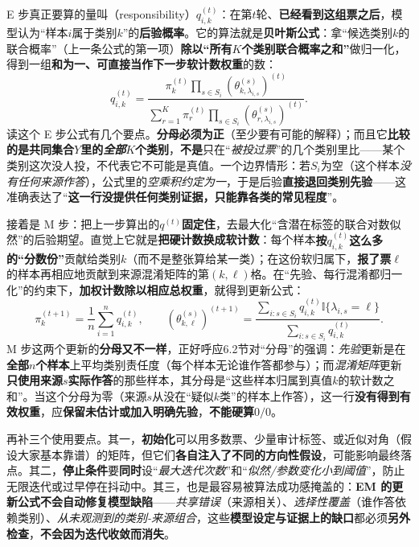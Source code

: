 E 步真正要算的量叫（responsibility）$q_{i,k}^{(t)}$：在第$t$轮、\textbf{已经看到这组票之后}，模型认为“样本$i$属于类别$k$”的\textbf{后验概率}。它的算法就是\textbf{贝叶斯公式}：拿“候选类别$k$的联合概率”（上一条公式的第一项）\textbf{除以“所有$K$个类别联合概率之和”}做归一化，得到一组\textbf{和为一、可直接当作下一步软计数权重}的数：
\begin{equation}
  q_{i,k}^{(t)}
  =
  \frac{\pi_k^{(t)}
    \prod_{s\in S_i}
    \left(\theta^{(s)}_{k,\lambda_{i,s}}\right)^{(t)}}
  {\sum_{r=1}^{K}\pi_r^{(t)}
    \prod_{s\in S_i}
    \left(\theta^{(s)}_{r,\lambda_{i,s}}\right)^{(t)}}.
  \label{eq:knowledge-fusion-dawid-skene-e-step}
\end{equation}
读这个 E 步公式有几个要点。\textbf{分母必须为正}（至少要有可能的解释）；而且它\textbf{比较的是共同集合$Y$里的\emph{全部}$K$个类别}，\textbf{不是}只在“\emph{被投过票}”的几个类别里比——某个类别这次没人投，不代表它不可能是真值。一个边界情形：若$S_i$为空（这个样本\emph{没有任何来源作答}），公式里的\emph{空乘积约定为一}，于是后验\textbf{直接退回类别先验}——这准确表达了“\textbf{这一行没提供任何类别证据，只能靠各类的常见程度}”。

接着是 M 步：把上一步算出的$q^{(t)}$\textbf{固定住}，去最大化“含潜在标签的联合对数似然”的后验期望。直觉上它就是\textbf{把硬计数换成软计数}：每个样本\textbf{按$q_{i,k}^{(t)}$这么多的“分数份”}贡献给类别$k$（而不是整张算给某一类）；在这份软归属下，\textbf{报了票$\ell$}的样本再相应地贡献到来源混淆矩阵的第$(k,\ell)$格。在“先验、每行混淆都归一化”的约束下，\textbf{加权计数除以相应总权重}，就得到更新公式：
\begin{equation}
  \pi_k^{(t+1)}
  =\frac{1}{n}\sum_{i=1}^{n}q_{i,k}^{(t)},
  \qquad
  \left(\theta^{(s)}_{k,\ell}\right)^{(t+1)}
  =
  \frac{\sum_{i:s\in S_i}
    q_{i,k}^{(t)}\mathbb{I}\{\lambda_{i,s}=\ell\}}
  {\sum_{i:s\in S_i}q_{i,k}^{(t)}}.
  \label{eq:knowledge-fusion-dawid-skene-m-step}
\end{equation}
M 步这两个更新的\textbf{分母又不一样}，正好呼应6.2节对“分母”的强调：\emph{先验}更新是在\textbf{全部$n$个样本}上平均类别责任度（每个样本无论谁作答都参与）；而\emph{混淆矩阵}更新\textbf{只使用来源$s$实际作答}的那些样本，其分母是“这些样本归属到真值$k$的软计数之和”。当这个分母为零（来源$s$从没在“疑似$k$类”的样本上作答），这一行\textbf{没有得到有效权重}，应\textbf{保留未估计或加入明确先验}，\textbf{不能硬算$0/0$}。

再补三个使用要点。其一，\textbf{初始化}可以用多数票、少量审计标签、或近似对角（假设大家基本靠谱）的矩阵，但它们\textbf{各自注入了不同的方向性假设}，可能影响最终落点。其二，\textbf{停止条件}要\textbf{同时}设“\emph{最大迭代次数}”和“\emph{似然/参数变化小到阈值}”，防止无限迭代或过早停在抖动中。其三，也是最容易被算法成功感掩盖的：\textbf{EM 的更新公式不会自动修复模型缺陷}——\emph{共享错误}（来源相关）、\emph{选择性覆盖}（谁作答依赖类别）、\emph{从未观测到的类别-来源组合}，这些\textbf{模型设定与证据上的缺口}都必须\textbf{另外检查}，\textbf{不会因为迭代收敛而消失}。

